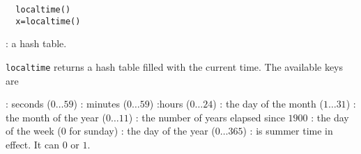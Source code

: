 \begin{mandesc}
\end{mandesc}

\begin{calling_sequence}
\begin{verbatim}
  localtime()
  x=localtime()  
\end{verbatim}
\end{calling_sequence}
\begin{parameters}
  \begin{varlist}
    : a hash table.
  \end{varlist}
\end{parameters}
\begin{mandescription}
  \verb!localtime! returns a hash table filled with the
  current time. The available keys are
  \begin{varlist}
  : seconds ($0 \dots 59$)
  : minutes ($0 \dots 59$)
  :hours ($0 \dots 24$)
  : the day of the month ($1 \dots 31$)
  : the month of the year ($0 \dots 11$)
  : the number of years elapsed since $1900$
  : the day of the week ($0$ for sunday)
  : the day of the year ($0 \dots 365$)
  : is summer time in effect. It can $0$ or $1$.
  \end{varlist}
\end{mandescription} 


